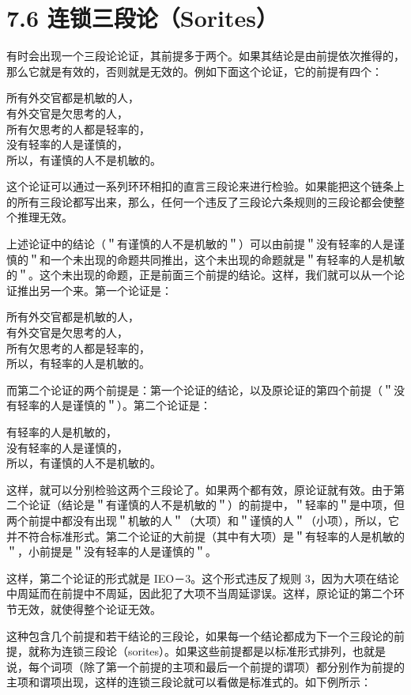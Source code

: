\section*{7.6 连锁三段论（Sorites）}
有时会出现一个三段论论证，其前提多于两个。如果其结论是由前提依次推得的，那么它就是有效的，否则就是无效的。例如下面这个论证，它的前提有四个：

所有外交官都是机敏的人，\\
有外交官是欠思考的人，\\
所有欠思考的人都是轻率的，\\
没有轻率的人是谨慎的，\\
所以，有谨慎的人不是机敏的。

这个论证可以通过一系列环环相扣的直言三段论来进行检验。如果能把这个链条上的所有三段论都写出来，那么，任何一个违反了三段论六条规则的三段论都会使整个推理无效。

上述论证中的结论（＂有谨慎的人不是机敏的＂）可以由前提＂没有轻率的人是谨慎的＂和一个未出现的命题共同推出，这个未出现的命题就是＂有轻率的人是机敏的＂。这个未出现的命题，正是前面三个前提的结论。这样，我们就可以从一个论证推出另一个来。第一个论证是：

所有外交官都是机敏的人，\\
有外交官是欠思考的人，\\
所有欠思考的人都是轻率的，\\
所以，有轻率的人是机敏的。

而第二个论证的两个前提是：第一个论证的结论，以及原论证的第四个前提（＂没有轻率的人是谨慎的＂）。第二个论证是：

有轻率的人是机敏的，\\
没有轻率的人是谨慎的，\\
所以，有谨慎的人不是机敏的。

这样，就可以分别检验这两个三段论了。如果两个都有效，原论证就有效。由于第二个论证（结论是＂有谨慎的人不是机敏的＂）的前提中，＂轻率的＂是中项，但两个前提中都没有出现＂机敏的人＂（大项）和＂谨慎的人＂（小项），所以，它并不符合标准形式。第二个论证的大前提（其中有大项）是＂有轻率的人是机敏的＂，小前提是＂没有轻率的人是谨慎的＂。

这样，第二个论证的形式就是 IEO－3。这个形式违反了规则 3，因为大项在结论中周延而在前提中不周延，因此犯了大项不当周延谬误。这样，原论证的第二个环节无效，就使得整个论证无效。

这种包含几个前提和若干结论的三段论，如果每一个结论都成为下一个三段论的前提，就称为连锁三段论（sorites）。如果这些前提都是以标准形式排列，也就是说，每个词项（除了第一个前提的主项和最后一个前提的谓项）都分别作为前提的主项和谓项出现，这样的连锁三段论就可以看做是标准式的。如下例所示：

